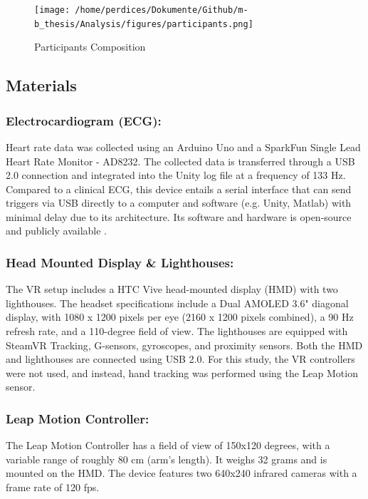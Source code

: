 \documentclass[12pt,oneside,openright]{report}
\begin{document}
\begin{figure}[h]
    \centering
    \texttt{[image: /home/perdices/Dokumente/Github/m-b\_thesis/Analysis/figures/participants.png]}
    \caption{Participants Composition}
    \label{fig:mesh1}
\end{figure}

    
\subsection*{Materials}
\subsubsection*{Electrocardiogram (ECG):}
Heart rate data was collected using an Arduino Uno and a SparkFun Single Lead Heart Rate Monitor - AD8232. The collected data is transferred through a USB 2.0 connection and integrated into the Unity log file at a frequency of 133 Hz. Compared to a clinical ECG, this device entails a serial interface that can send triggers via USB directly to a computer and software (e.g. Unity, Matlab) with minimal delay due to its architecture. Its software and hardware is open-source and publicly available \parencite{TimsECG}.

\subsubsection*{Head Mounted Display \& Lighthouses:}
The VR setup includes a HTC Vive head-mounted display (HMD) with two lighthouses. The headset specifications include a Dual AMOLED 3.6" diagonal display, with 1080 x 1200 pixels per eye (2160 x 1200 pixels combined), a 90 Hz refresh rate, and a 110-degree field of view. The lighthouses are equipped with SteamVR Tracking, G-sensors, gyroscopes, and proximity sensors. Both the HMD and lighthouses are connected using USB 2.0. For this study, the VR controllers were not used, and instead, hand tracking was performed using the Leap Motion sensor.

\subsubsection*{Leap Motion Controller:}
The Leap Motion Controller has a field of view of 150x120 degrees, with a variable range of roughly 80 cm (arm's length). It weighs 32 grams and is mounted on the HMD. The device features two 640x240 infrared cameras with a frame rate of 120 fps.
\end{document}
